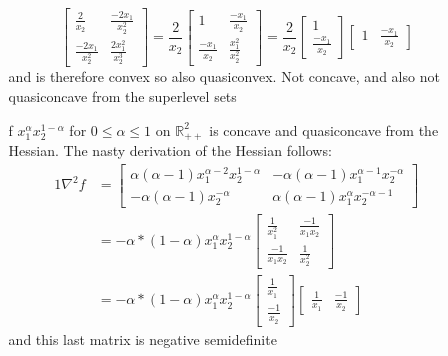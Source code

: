 \documentclass[12pt]{article}
\begin{document}
\begin{itemize}
\begin{itemize}
$$\begin{bmatrix}
        \frac{2}{x_2} & \frac{-2 x_1}{x_2^2} \\
         \frac{-2 x_1}{x_2^2} &  \frac{2 x_1^2}{x_2^3}
       \end{bmatrix} =
       \frac{2}{x_2} \begin{bmatrix}
        1 & \frac{-x_1}{x_2}\\
         \frac{-x_1}{x_2} & \frac{x_1^2}{x_2^2}
        \end{bmatrix} =
      \frac{2}{x_2} \begin{bmatrix}
        1 \\
         \frac{-x_1}{x_2}
        \end{bmatrix} \begin{bmatrix}
        1 & \frac{-x_1}{x_2}
        \end{bmatrix}
        $$
        and is therefore convex so also quasiconvex. Not concave, and also not quasiconcave from the superlevel sets
      \item[f] $x_1^\alpha x_2^{1 - \alpha}$ for $0 \leq \alpha \leq 1$ on $\mathbb{R}_{++}^2$ is concave and quasiconcave from the Hessian. The nasty derivation of the Hessian follows:
        \begin{alignat*}{1}
          \nabla^2 f & =
          \begin{bmatrix}
            \alpha (\alpha - 1) x_1^{\alpha - 2}x_2^{1 - \alpha} & -\alpha (\alpha - 1) x_1^{\alpha - 1} x_2^{-\alpha} \\
            -\alpha (\alpha - 1) x_2^{-\alpha} & \alpha (\alpha - 1) x_1^\alpha x_2^{-\alpha - 1}
          \end{bmatrix}\\
          & = -\alpha * (1-\alpha) x_1^{\alpha}x_2^{1-\alpha} \begin{bmatrix}
            \frac{1}{x_1^2} & \frac{-1}{x_1x_2} \\
            \frac{-1}{x_1x_2} & \frac{1}{x_2^2}
          \end{bmatrix}\\
          & = -\alpha * (1-\alpha) x_1^{\alpha}x_2^{1-\alpha} \begin{bmatrix}
            \frac{1}{x_1} \\
            \frac{-1}{x_2}
          \end{bmatrix} \begin{bmatrix}
            \frac{1}{x_1} & \frac{-1}{x_2}
            \end{bmatrix}
        \end{alignat*}
        and this last matrix is negative semidefinite 

\end{itemize}
\end{itemize}
\end{document}
